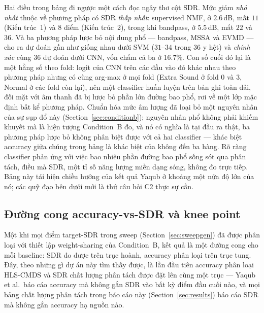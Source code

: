 \documentclass[11pt]{article}
\begin{document}
Hai điều trong bảng đi ngược một cách đọc ngây thơ cột SDR. Mức giảm
\emph{nhỏ nhất} thuộc về phương pháp có SDR \emph{thấp nhất}: supervised
NMF, ở $2.6$\,dB, mất $11$ (Kiến trúc~1) và $8$ điểm (Kiến trúc~2), trong
khi bandpass, ở $5.5$\,dB, mất $22$ và $36$. Và ba phương pháp lược bỏ nội
dung phổ --- bandpass, MSSA và EVMD --- cho ra dự đoán gần như giống nhau
dưới SVM ($31$--$34$ trong 36 y hệt) và \emph{chính xác} cùng 36 dự đoán
dưới CNN, vốn chấm cả ba ở $16.7\%$. Con số cuối đó lại là một hằng số
theo fold: logit của CNN trên các đầu vào đó khác nhau theo phương pháp
nhưng có cùng arg-max ở mọi fold (Extra Sound ở fold 0 và 3, Normal ở các
fold còn lại), nên một classifier huấn luyện trên bản ghi toàn dải, đối
mặt với âm thanh đã bị lược bỏ phần lớn đường bao phổ, rơi về một lớp mặc
định bất kể phương pháp. Chuẩn hóa mức âm lượng đã loại bỏ một nguyên
nhân của sự sụp đổ này (Section~\ref{sec:conditionb}); nguyên nhân phổ
không phải khiếm khuyết mà là hiện tượng Condition~B đo, và nó có nghĩa
là tại đầu ra thật, ba phương pháp lược bỏ không phân biệt được với cả
hai classifier --- khác biệt accuracy giữa chúng trong bảng là khác biệt
của không đến ba hàng. Rõ ràng classifier phản ứng với việc bao nhiêu
phần đường bao phổ sống sót qua phân tách, điều mà SDR, một tỉ số năng
lượng miền dạng sóng, không đo trực tiếp. Bảng này tái hiện chiều hướng
của kết quả Yaqub ở khoảng một nửa độ lớn của nó; các quỹ đạo bên dưới
mới là thứ câu hỏi C2 thực sự cần.

\subsection{Đường cong accuracy-vs-SDR và knee point}
\label{sec:knee}

Một khi mọi điểm target-SDR trong sweep (Section~\ref{sec:sweepgen}) đã
được phân loại với thiết lập weight-sharing của Condition~B, kết quả là
một đường cong cho mỗi baseline: SDR đo được trên trục hoành, accuracy
phân loại trên trục tung. Đây, theo những gì dự án này tìm thấy được, là
lần đầu tiên accuracy phân loại HLS-CMDS và SDR chất lượng phân tách
được đặt lên cùng một trục --- Yaqub et al.\ báo cáo accuracy mà không
gắn SDR vào bất kỳ điểm đầu cuối nào, và mọi bảng chất lượng phân tách
trong báo cáo này (Section~\ref{sec:results}) báo cáo SDR mà không gắn
accuracy hạ nguồn nào.
\end{document}

